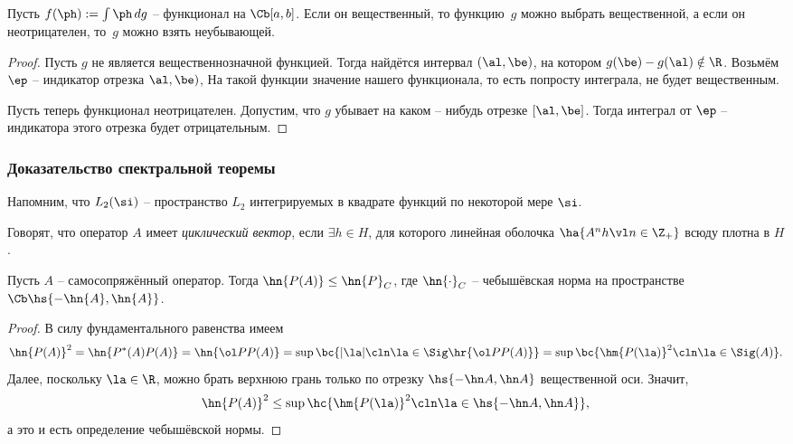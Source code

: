 \documentclass[a4paper]{article}
\begin{document}
\begin{stm}
Пусть $f(\ph) := \int \ph\, dg$ -- функционал на $\Cb[a,b]$. Если он вещественный,
то функцию~$g$ можно выбрать вещественной, а если он неотрицателен, то~$g$ можно
взять неубывающей.
\end{stm}
\begin{proof}
Пусть $g$ не является вещественнозначной функцией. Тогда найдётся интервал $(\al,\be)$, на котором
$g(\be) - g(\al) \notin \R$. Возьмём $\ep$ -- индикатор отрезка $\al, \be)$,
На такой функции значение нашего функционала, то есть попросту интеграла, не будет вещественным.

Пусть теперь функционал неотрицателен. Допустим, что $g$ убывает на каком -- нибудь отрезке $[\al,\be]$.
Тогда интеграл от $\ep$ -- индикатора этого отрезка будет отрицательным.
\end{proof}

\subsubsection{Доказательство спектральной теоремы}

Напомним, что $L_2(\si)$ -- пространство $L_2$ интегрируемых в квадрате функций по некоторой мере $\si$.

\begin{df}
Говорят, что оператор $A$ имеет \emph{циклический вектор}, если $\exi h \in H$, для которого линейная оболочка
$\ha{A^n h \vl n \in \Z_+}$ всюду плотна в $H$.
\end{df}

\begin{lemma}
Пусть $A$ -- самосопряжённый оператор. Тогда
$\hn{P(A)} \le \hn{P}_C$, где $\hn{\cdot}_C$ -- чебышёвская норма на пространстве $\Cb\hs{-\hn{A}, \hn{A}}$.
\end{lemma}
\begin{proof}
В силу фундаментального равенства имеем
$$\hn{P(A)}^2 = \hn{P^*(A)P(A)} = \hn{\ol P P(A)} =
  \sup \bc{|\la|\cln \la \in \Sig\hr{\ol P P(A)}} =
  \sup\bc{\hm{P(\la)}^2\cln \la \in \Sig(A)}.$$
Далее, поскольку $\la \in \R$, можно брать верхнюю грань только по отрезку $\hs{-\hn A, \hn A}$ вещественной оси.
Значит,
$$\hn{P(A)}^2 \le \sup \hc{\hm{P(\la)}^2\cln \la \in \hs{-\hn A, \hn A}},$$
а это и есть определение чебышёвской нормы.
\end{proof}
\end{document}
